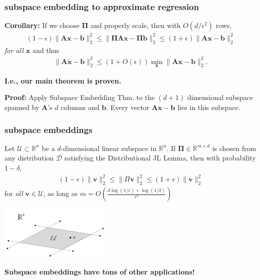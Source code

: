 \documentclass[compress]{beamer}
\newcommand{\bs}[1]{\boldsymbol{#1}}
\newcommand{\bv}[1]{\mathbf{#1}}
\newcommand{\R}{\mathbb{R}}
\begin{document}
\begin{frame}
	\frametitle{subspace embedding to approximate regression}
	\textbf{Corollary:} If we choose $\bs{\Pi}$ and properly scale, then with $O\left(d/\epsilon^2\right)$ rows, 
	\begin{align*}
		(1-\epsilon)\|\bv{A}\bv{x} - \bv{b}\|_2^2 \leq  \|\bs{\Pi}\bv{A}\bv{x} - \bs{\Pi}\bv{b}\|_2^2 \leq (1+\epsilon) \|\bv{A}\bv{x} - \bv{b}\|_2^2
	\end{align*}
	\emph{for all $\bv{x}$} and thus
	\begin{align*}
		\|\bv{A}\tilde{\bv{x}} - \bv{b}\|_2^2 \leq \left(1+O(\epsilon)\right) \min_{\bv{x}} \|\bv{A}\bv{x} - \bv{b}\|_2^2.
	\end{align*} 
	\begin{center}
		\alert{\textbf{I.e., our main theorem is proven.}}
	\end{center}
	
	\textbf{Proof:} Apply Subspace Embedding Thm. to the $(d+1)$ dimensional subspace spanned by $\bv{A}$'s $d$ columns and $\bv{b}$. Every vector $\bv{Ax - b}$ lies in this subspace.
\end{frame}

\begin{frame}
	\frametitle{subspace embeddings}
	\begin{theorem}
		Let $\mathcal{U} \subset \R^n$ be a $d$-dimensional linear subspace in $\R^n$. If $\bs{\Pi}\in \R^{m\times d}$ is chosen from any distribution $\mathcal{D}$ satisfying the Distributional JL Lemma, then with probability $1-\delta$,
		\begin{align}
			\label{se_goal}
			(1-\epsilon) \|\bv{v}\|_2^2 \leq \|\Pi \bv{v}\|_2^2 \leq	(1+\epsilon)\|\bv{v}\|_2^2
		\end{align}
		for \emph{all} $\bv{v} \in \mathcal{U}$, as long as  $m = O\left(\frac{d\log(1/\epsilon) + \log(1/\delta)}{\epsilon^2}\right)$
	\end{theorem}
	\begin{center}
		\includegraphics[width=0.4\textwidth]{subspace_vis.png}
		
		\textbf{\alert{Subspace embeddings have tons of other applications!}}
	\end{center}
\end{frame}
\end{document}

